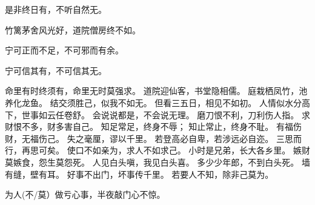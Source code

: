 \documentclass[12pt,UTF8]{ctexbook}
\begin{document}
是非终日有，不听自然无。

竹篱茅舍风光好，道院僧房终不如。

宁可正而不足，不可邪而有余。

宁可信其有，不可信其无。

命里有时终须有，命里无时莫强求。
道院迎仙客，书堂隐相儒。
庭栽栖凤竹，池养化龙鱼。
结交须胜己，似我不如无。
但看三五日，相见不如初。
人情似水分高下，世事如云任卷舒。
会说说都是，不会说无理。
磨刀恨不利，刀利伤人指。
求财恨不多，财多害自己。
知足常足，终身不辱；
知止常止，终身不耻。
有福伤财，无福伤己。
失之毫厘，谬以千里。
若登高必自卑，若涉远必自迩。
三思而行，再思可矣。
使口不如亲为，求人不如求己。
小时是兄弟，长大各乡里。
嫉财莫嫉食，怨生莫怨死。
人见白头嗔，我见白头喜。
多少少年郎，不到白头死。
墙有缝，壁有耳。
好事不出门，坏事传千里。
若要人不知，除非己莫为。

为人(不/莫）做亏心事，半夜敲门心不惊。
\end{document}
